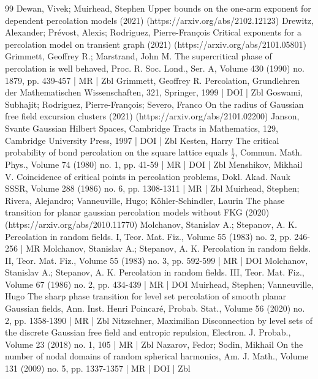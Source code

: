 \documentclass[10pt]{amsart}
\theoremstyle{definition}\newtheorem{defi}[theo]{Definition}\newtheorem{rema}[theo]{Remark}\newtheorem{exam}[theo]{Example}\newtheorem{exem}[theo]{Example}\newtheorem{nota}[theo]{Notation}
\begin{document}
\begin{thebibliography}{99}
Dewan, Vivek; Muirhead, Stephen Upper bounds on the one-arm exponent for dependent percolation models (2021) (https://arxiv.org/abs/2102.12123)
Drewitz, Alexander; Prévost, Alexis; Rodriguez, Pierre-François Critical exponents for a percolation model on transient graph (2021) (https://arxiv.org/abs/2101.05801)
Grimmett, Geoffrey R.; Marstrand, John M. The supercritical phase of percolation is well behaved, Proc. R. Soc. Lond., Ser. A, Volume 430 (1990) no. 1879, pp. 439-457 | MR | Zbl
Grimmett, Geoffrey R. Percolation, Grundlehren der Mathematischen Wissenschaften, 321, Springer, 1999 | DOI | Zbl
Goswami, Subhajit; Rodriguez, Pierre-François; Severo, Franco On the radius of Gaussian free field excursion clusters (2021) (https://arxiv.org/abs/2101.02200)
Janson, Svante Gaussian Hilbert Spaces, Cambridge Tracts in Mathematics, 129, Cambridge University Press, 1997 | DOI | Zbl
Kesten, Harry The critical probability of bond percolation on the square lattice equals $\frac{1}{2}$, Commun. Math. Phys., Volume 74 (1980) no. 1, pp. 41-59 | MR | DOI | Zbl
Menshikov, Mikhail V. Coincidence of critical points in percolation problems, Dokl. Akad. Nauk SSSR, Volume 288 (1986) no. 6, pp. 1308-1311 | MR | Zbl
Muirhead, Stephen; Rivera, Alejandro; Vanneuville, Hugo; Köhler-Schindler, Laurin The phase transition for planar gaussian percolation models without FKG (2020) (https://arxiv.org/abs/2010.11770)
Molchanov, Stanislav A.; Stepanov, A. K. Percolation in random fields. I, Teor. Mat. Fiz., Volume 55 (1983) no. 2, pp. 246-256 | MR
Molchanov, Stanislav A.; Stepanov, A. K. Percolation in random fields. II, Teor. Mat. Fiz., Volume 55 (1983) no. 3, pp. 592-599 | MR | DOI
Molchanov, Stanislav A.; Stepanov, A. K. Percolation in random fields. III, Teor. Mat. Fiz., Volume 67 (1986) no. 2, pp. 434-439 | MR | DOI
Muirhead, Stephen; Vanneuville, Hugo The sharp phase transition for level set percolation of smooth planar Gaussian fields, Ann. Inst. Henri Poincaré, Probab. Stat., Volume 56 (2020) no. 2, pp. 1358-1390 | MR | Zbl
Nitzschner, Maximilian Disconnection by level sets of the discrete Gaussian free field and entropic repulsion, Electron. J. Probab., Volume 23 (2018) no. 1, 105 | MR | Zbl
Nazarov, Fedor; Sodin, Mikhail On the number of nodal domains of random spherical harmonics, Am. J. Math., Volume 131 (2009) no. 5, pp. 1337-1357 | MR | DOI | Zbl

\end{thebibliography}
\end{document}
